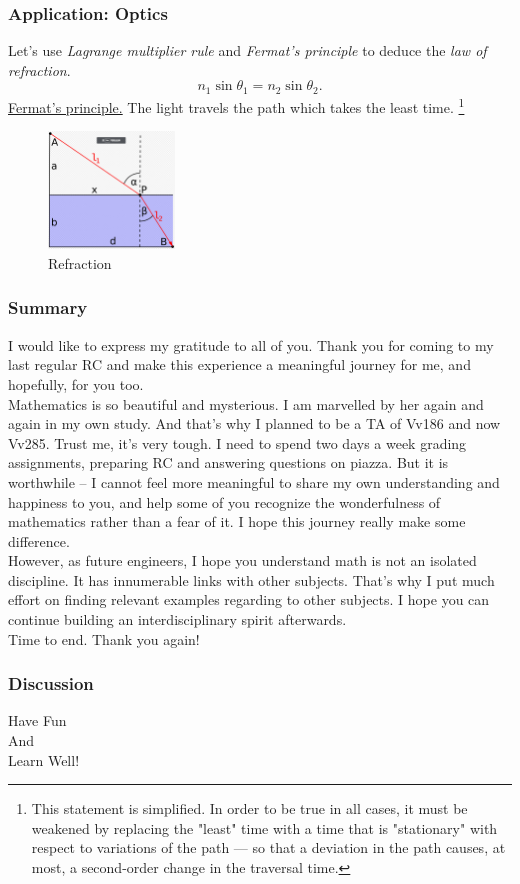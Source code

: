 \documentclass[10pt, t, allowdisplaybreaks]{beamer}
\begin{document}
\begin{frame}
    \frametitle{Application: Optics}
    Let's use \textit{Lagrange multiplier rule} and \textit{Fermat's principle} to deduce the \textit{law of refraction}.
    $$n_1\sin\theta_1=n_2\sin\theta_2.$$
    \href{https://en.wikipedia.org/wiki/Fermat\%27s_principle}{Fermat's principle.} The light travels the path which takes the least time. \footnote[frame]{This statement is simplified. In order to be true in all cases, it must be weakened by replacing the "least" time with a time that is "stationary" with respect to variations of the path — so that a deviation in the path causes, at most, a second-order change in the traversal time.}
    \begin{figure}[H]
        \centering
        \includegraphics[width=0.3\textwidth]{Figures/2020-07-29-16-52-32.png}
        \caption{Refraction}
    \end{figure}
\end{frame}

\begin{frame}
    \frametitle{Summary}

    I would like to express my gratitude to all of you. Thank you for coming to my last regular RC and make this experience a meaningful journey for me, and hopefully, for you too.\\[8pt]
    Mathematics is so beautiful and mysterious. I am marvelled by her again and again in my own study. And that's why I planned to be a TA of Vv186 and now Vv285. Trust me, it's very tough. I need to spend two days a week grading assignments, preparing RC and answering questions on piazza. But it is worthwhile -- I cannot feel more meaningful to share my own understanding and happiness to you, and help some of you recognize the wonderfulness of mathematics rather than a fear of it. I hope this journey really make some difference.
    \\[8pt]
    However, as future engineers, I hope you understand math is not an isolated discipline. It has innumerable links with other subjects. That's why I put much effort on finding relevant examples regarding to other subjects. I hope you can continue building an interdisciplinary spirit afterwards.
    \\[8pt]
    Time to end. Thank you again!
\end{frame}

\begin{frame}
    \frametitle{Discussion}
    \vfill
    \begin{center}
        \LARGE
        Have Fun\\
        And\\
        Learn Well!
    \end{center}
    \vfill
\end{frame}
\end{document}
